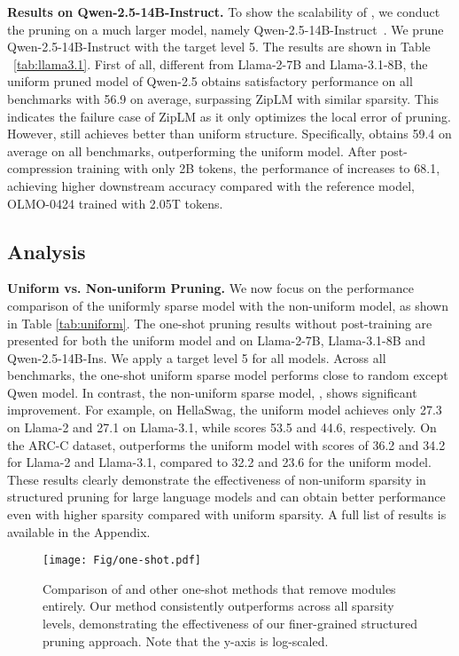 \noindent \textbf{Results on Qwen-2.5-14B-Instruct.} To show the scalability of \sysname, we conduct the pruning on a much larger model, namely Qwen-2.5-14B-Instruct~\citep{qwen2.5}. We prune Qwen-2.5-14B-Instruct with the target level 5. The results are shown in Table ~\ref{tab:llama3.1}. First of all, different from Llama-2-7B and Llama-3.1-8B, the uniform pruned model of Qwen-2.5 obtains satisfactory performance on all benchmarks with 56.9 on average, surpassing ZipLM with similar sparsity. This indicates the failure case of ZipLM as it only optimizes the local error of pruning. However, \sysname still achieves better than uniform structure. Specifically, \sysname obtains 59.4 on average on all benchmarks, outperforming the uniform model. After post-compression training with only 2B tokens, the performance of \sysname increases to 68.1, achieving higher downstream accuracy compared with the reference model, OLMO-0424 trained with 2.05T tokens.

\subsection{Analysis}

\noindent \textbf{Uniform vs. Non-uniform Pruning.} We now focus on the performance comparison of the uniformly sparse model with the non-uniform model, as shown in Table \ref{tab:uniform}. The one-shot pruning results without post-training are presented for both the uniform model and \sysname on Llama-2-7B, Llama-3.1-8B and Qwen-2.5-14B-Ins. We apply a target level 5 for all models. Across all benchmarks, the one-shot uniform sparse model performs close to random except Qwen model. In contrast, the non-uniform sparse model, \sysname, shows significant improvement. For example, on HellaSwag, the uniform model achieves only 27.3 on Llama-2 and 27.1 on Llama-3.1, while \sysname scores 53.5 and 44.6, respectively. On the ARC-C dataset, \sysname outperforms the uniform model with scores of 36.2 and 34.2 for Llama-2 and Llama-3.1, compared to 32.2 and 23.6 for the uniform model. These results clearly demonstrate the effectiveness of non-uniform sparsity in structured pruning for large language models and \sysname can obtain better performance even with higher sparsity compared with uniform sparsity. A full list of results is available in the Appendix.



\begin{figure}[t]
    \centering
    \texttt{[image: Fig/one-shot.pdf]}
    \vspace{-0.25in} 
    \caption{Comparison of \sysname and other one-shot methods that remove modules entirely. Our method consistently outperforms across all sparsity levels, demonstrating the effectiveness of our finer-grained structured pruning approach. Note that the y-axis is log-scaled. }
    \label{fig:one-shot}
    \vspace{-0.15in}
\end{figure}

